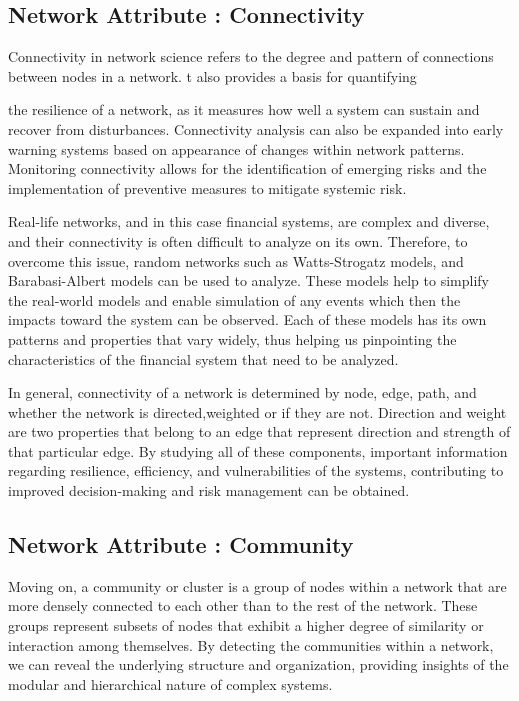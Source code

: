 \documentclass[a4paper,11pt]{article}
\begin{document}
\subsection{Network Attribute : Connectivity}
Connectivity in network science refers to the degree and pattern of connections between nodes in a network. t also provides a basis for quantifying

the resilience of a network, as it measures how well a system can sustain and recover from disturbances. Connectivity analysis can also be expanded into early warning systems based on appearance of changes within network patterns. Monitoring connectivity allows for the identification of emerging risks and the implementation of preventive measures to mitigate systemic risk.

Real-life networks, and in this case financial systems, are complex and diverse, and their connectivity is often difficult to analyze on its own. Therefore, to overcome this issue, random networks such as Watts-Strogatz models, and Barabasi-Albert models can be used to analyze. These models help to simplify the real-world models and enable simulation of any events which then the impacts toward the system can be observed. Each of these models has its own patterns and properties that vary widely, thus helping us pinpointing the characteristics of the financial system that need  to be analyzed.

In general, connectivity of a network is determined by node, edge, path, and whether the network is directed,weighted or if they are not. Direction and weight are two properties that belong to an edge that represent direction and strength of that particular edge. By studying all of these components, important information regarding resilience, efficiency, and vulnerabilities of the systems, contributing to improved decision-making and risk management can be obtained.

\subsection{Network Attribute : Community}
Moving on,  a community or cluster is a group of nodes within a network that are more densely connected to each other than to the rest of the network. These groups represent subsets of nodes that exhibit a higher degree of similarity or interaction among themselves. By detecting the communities within a network, we can reveal the underlying structure and organization, providing insights of  the modular and hierarchical nature of complex systems.
\end{document}
